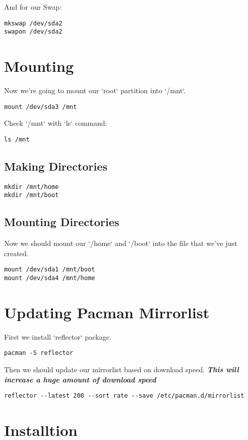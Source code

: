 \documentclass[12pt]{article}
\begin{document}
And for our Swap:

\begin{verbatim}
mkswap /dev/sda2
swapon /dev/sda2
\end{verbatim}

\section{Mounting}
Now we're going to mount our `root` partition into `/mnt`.
\begin{verbatim}
mount /dev/sda3 /mnt
\end{verbatim}
Check `/mnt` with `ls` command:
\begin{verbatim}
ls /mnt
\end{verbatim}

\subsection{Making Directories}
\begin{verbatim}
mkdir /mnt/home
mkdir /mnt/boot
\end{verbatim}

\subsection{Mounting Directories}
Now we should mount our `/home` and `/boot` into the file that we've just created.
\begin{verbatim}
mount /dev/sda1 /mnt/boot
mount /dev/sda4 /mnt/home
\end{verbatim}

\section{Updating Pacman Mirrorlist}
First we install `reflector` package.
\begin{verbatim}
pacman -S reflector
\end{verbatim}
Then we should update our mirrorlist based on download speed.\newline\newline
\textit{\textbf{This will increase a huge amount of download speed}}
\begin{verbatim}
reflector --latest 200 --sort rate --save /etc/pacman.d/mirrorlist
\end{verbatim}

\section{Installtion}
\end{document}
